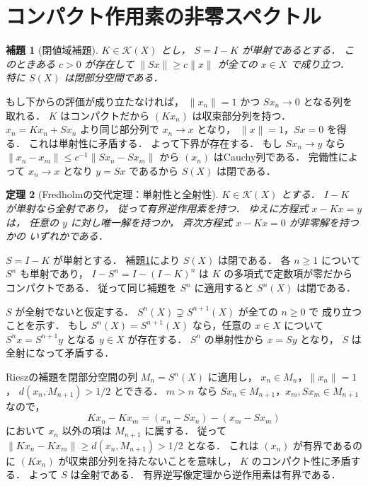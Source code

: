 \documentclass[a5paper,10pt,onecolumn]{jsarticle}
\makeatletter
\theoremstyle{mathnotetheorem}
\newtheorem{theorem}{定理}[section]
\newtheorem{lemma}[theorem]{補題}
\renewcommand{\proofname}{証明}
\renewenvironment{proof}[1][\proofname]{%
  \par\pushQED{\qed}\normalfont\topsep4\p@\@plus2\p@\relax
  \trivlist\item[\hskip\labelsep\bfseries #1]\ignorespaces
}{\popQED\endtrivlist\@endpefalse}
\newcommand{\norm}[1]{\lVert #1\rVert}
\makeatother
\begin{document}
\section{コンパクト作用素の非零スペクトル}

\begin{lemma}[閉値域補題]\label{lem:bounded-below}
$K\in\mathcal K(X)$ とし，
$S=I-K$ が単射であるとする．
このときある $c>0$ が存在して
$\norm{Sx}\ge c\norm x$ が全ての $x\in X$ で成り立つ．
特に $S(X)$ は閉部分空間である．
\end{lemma}
\begin{proof}
もし下からの評価が成り立たなければ，
$\norm{x_n}=1$ かつ $Sx_n\to0$ となる列を取れる．
$K$ はコンパクトだから $(Kx_n)$ は収束部分列を持つ．
$x_n=Kx_n+Sx_n$ より同じ部分列で $x_n\to x$ となり，
$\norm x=1$，$Sx=0$ を得る．
これは単射性に矛盾する．
よって下界が存在する．
もし $Sx_n\to y$ なら
$\norm{x_n-x_m}\le c^{-1}\norm{Sx_n-Sx_m}$
から $(x_n)$ はCauchy列である．
完備性によって $x_n\to x$ となり
$y=Sx$ であるから $S(X)$ は閉である．
\end{proof}

\begin{theorem}[Fredholmの交代定理：単射性と全射性]\label{thm:fredholm}
$K\in\mathcal K(X)$ とする．
$I-K$ が単射なら全射であり，
従って有界逆作用素を持つ．
ゆえに方程式 $x-Kx=y$ は，
任意の $y$ に対し唯一解を持つか，
斉次方程式 $x-Kx=0$ が非零解を持つかの
いずれかである．
\end{theorem}
\begin{proof}
$S=I-K$ が単射とする．
補題\ref{lem:bounded-below}により $S(X)$ は閉である．
各 $n\ge1$ について $S^n$ も単射であり，
$I-S^n=I-(I-K)^n$ は $K$ の多項式で定数項が零だから
コンパクトである．
従って同じ補題を $S^n$ に適用すると
$S^n(X)$ は閉である．

$S$ が全射でないと仮定する．
$S^n(X)\supsetneq S^{n+1}(X)$ が全ての $n\ge0$ で
成り立つことを示す．
もし $S^n(X)=S^{n+1}(X)$ なら，任意の $x\in X$ について
$S^nx=S^{n+1}y$ となる $y\in X$ が存在する．
$S^n$ の単射性から $x=Sy$ となり，
$S$ は全射になって矛盾する．

Rieszの補題を閉部分空間の列
$M_n=S^n(X)$ に適用し，
$x_n\in M_n$，$\norm{x_n}=1$，
$d(x_n,M_{n+1})>1/2$ とできる．
$m>n$ なら
$Sx_n\in M_{n+1}$，$x_m,Sx_m\in M_{n+1}$ なので，
\[
 Kx_n-Kx_m
 =(x_n-Sx_n)-(x_m-Sx_m)
\]
において $x_n$ 以外の項は $M_{n+1}$ に属する．
従って
$\norm{Kx_n-Kx_m}\ge d(x_n,M_{n+1})>1/2$ となる．
これは $(x_n)$ が有界であるのに
$(Kx_n)$ が収束部分列を持たないことを意味し，
$K$ のコンパクト性に矛盾する．
よって $S$ は全射である．
有界逆写像定理から逆作用素は有界である．
\end{proof}
\end{document}

